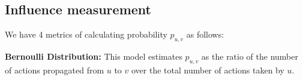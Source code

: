 





\subsection{Influence measurement}
We have 4 metrics of calculating probability $p_{u,v}$ as follows:

\textbf{Bernoulli Distribution:} This model estimates $p_{u,v}$ as the ratio of the number of actions propagated from $u$ to $v$ over the total number of actions taken by $u$.

